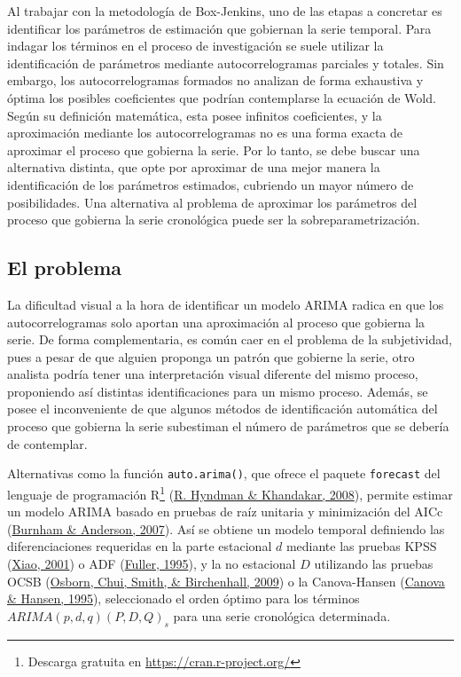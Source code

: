 \documentclass[
]{article}
\begin{document}
Al trabajar con la metodología de Box-Jenkins, uno de las etapas a
concretar es identificar los parámetros de estimación que gobiernan la
serie temporal. Para indagar los términos en el proceso de investigación
se suele utilizar la identificación de parámetros mediante
autocorrelogramas parciales y totales. Sin embargo, los
autocorrelogramas formados no analizan de forma exhaustiva y óptima los
posibles coeficientes que podrían contemplarse la ecuación de Wold.
Según su definición matemática, esta posee infinitos coeficientes, y la
aproximación mediante los autocorrelogramas no es una forma exacta de
aproximar el proceso que gobierna la serie. Por lo tanto, se debe buscar
una alternativa distinta, que opte por aproximar de una mejor manera la
identificación de los parámetros estimados, cubriendo un mayor número de
posibilidades. Una alternativa al problema de aproximar los parámetros
del proceso que gobierna la serie cronológica puede ser la
sobreparametrización.

\subsection{El problema}

La dificultad visual a la hora de identificar un modelo ARIMA radica en
que los autocorrelogramas solo aportan una aproximación al proceso que
gobierna la serie. De forma complementaria, es común caer en el problema
de la subjetividad, pues a pesar de que alguien proponga un patrón que
gobierne la serie, otro analista podría tener una interpretación visual
diferente del mismo proceso, proponiendo así distintas identificaciones
para un mismo proceso. Además, se posee el inconveniente de que algunos
métodos de identificación automática del proceso que gobierna la serie
subestiman el número de parámetros que se debería de contemplar.

Alternativas como la función \texttt{auto.arima()}, que ofrece el
paquete \texttt{forecast} del lenguaje de programación R\footnote{Descarga
  gratuita en \url{https://cran.r-project.org/}}
(\protect\hyperlink{ref-auto.arima}{R. Hyndman \& Khandakar, 2008}),
permite estimar un modelo ARIMA basado en pruebas de raíz unitaria y
minimización del AICc (\protect\hyperlink{ref-burnham2007model}{Burnham
\& Anderson, 2007}). Así se obtiene un modelo temporal definiendo las
diferenciaciones requeridas en la parte estacional \(d\) mediante las
pruebas KPSS
(\protect\hyperlink{ref-doi:10.1111ux2f1467-9892.00213}{Xiao, 2001}) o
ADF (\protect\hyperlink{ref-fuller1995introduction}{Fuller, 1995}), y la
no estacional \(D\) utilizando las pruebas OCSB
(\protect\hyperlink{ref-Osborn2009SEASONALITYAT}{Osborn, Chui, Smith, \&
Birchenhall, 2009}) o la Canova-Hansen
(\protect\hyperlink{ref-10.2307ux2f1392184}{Canova \& Hansen, 1995}),
seleccionado el orden óptimo para los términos
\(ARIMA(p, d, q)(P, D, Q)_s\) para una serie cronológica determinada.
\end{document}
